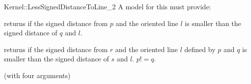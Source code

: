 \begin{ccRefFunctionObjectConcept}{Kernel::LessSignedDistanceToLine_2}
A model for this must provide:


{
returns  if the signed distance from $p$ and the oriented line $l$ 
is smaller than the signed distance of $q$ and $l$.
}

{
returns  if the signed distance from $r$ and the oriented line $l$ 
defined by $p$ and $q$ is smaller than the signed distance of $s$ and $l$.
\ccPrecond $p != q$.
}

\ccRefines
{} (with four arguments)

\ccSeeAlso
{}\\

\end{ccRefFunctionObjectConcept}
